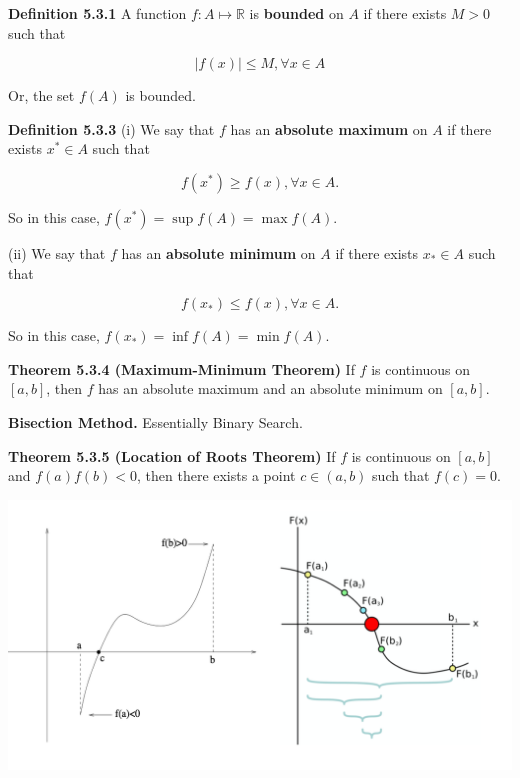 \documentclass[10pt,landscape]{article}
\begin{document}
\begin{multicols}{4}
\textbf{Definition 5.3.1} A function $f: A \mapsto \mathbb{R}$ is \textbf{bounded} on $A$ if there exists $M > 0$ such that 

$$
|f(x)| \leq M, \forall x \in A
$$

Or, the set $f(A)$ is bounded.






\textbf{Definition 5.3.3} (i) We say that $f$ has an \textbf{absolute maximum} on $A$ if there exists $x^* \in A$ such that 

$$
f(x^*) \geq f(x), \forall x \in A.
$$

So in this case, $f(x^*) = \sup f(A) = \max f(A)$.

(ii) We say that $f$ has an \textbf{absolute minimum} on $A$ if there exists $x_* \in A$ such that 

$$
f(x_*) \leq f(x), \forall x \in A.
$$

So in this case, $f(x_*) = \inf f(A) = \min f(A)$.

\textbf{Theorem 5.3.4 (Maximum-Minimum Theorem)} If $f$ is continuous on $[a, b]$, then $f$ has an absolute maximum and an absolute minimum on $[a, b]$.

\textbf{Bisection Method.} Essentially Binary Search.

\textbf{Theorem 5.3.5 (Location of Roots Theorem)} If $f$ is continuous on $[a , b]$ and $f(a)f(b) < 0$, then there exists a point $c \in (a, b)$  such that $f(c) = 0$.

\includegraphics[width=\columnwidth]{images/location-of-roots.png}


\end{multicols}
\end{document}
